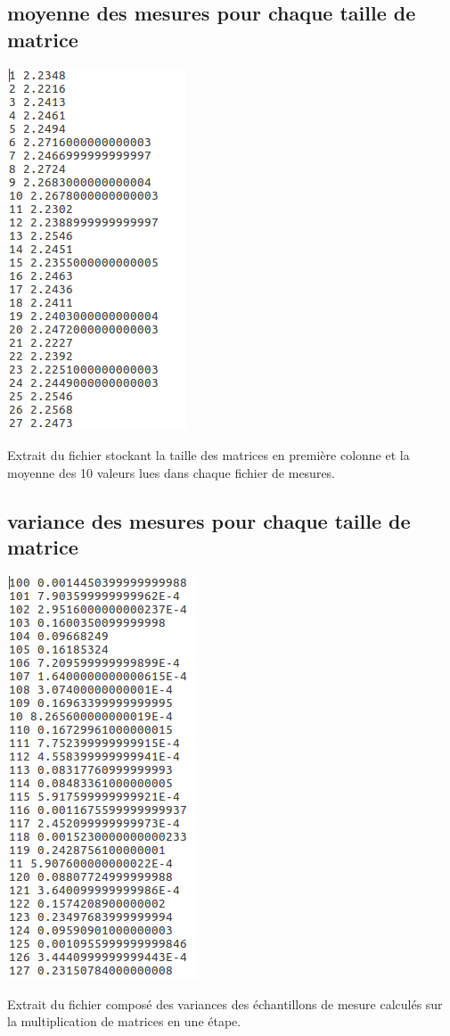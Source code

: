 \documentclass[a4paper, 11pt]{article}
\begin{document}
	\subsection{moyenne des mesures pour chaque taille de matrice}
	\label{txtmesuresMoy}
	\begin{center}
		\includegraphics[angle=0]{./img/extraitMoyTri.png}\par
		Extrait du fichier stockant la taille des matrices en première colonne et la moyenne des 10 valeurs lues dans chaque fichier de mesures.
	\end{center}
	\clearpage
	
	\subsection{variance des mesures pour chaque taille de matrice}
	\label{txtmesuresVar}
	\begin{center}
		\includegraphics[angle=0]{./img/extraitVariance.png}\par
		Extrait du fichier composé des variances des échantillons de mesure calculés sur la multiplication de matrices en une étape.
	\end{center}
	
\end{document}
